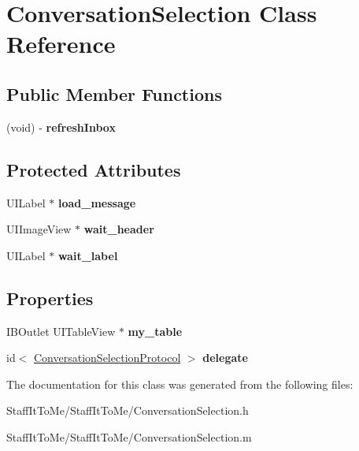 \hypertarget{interface_conversation_selection}{
\section{\-Conversation\-Selection \-Class \-Reference}
\label{interface_conversation_selection}
}
\subsection*{\-Public \-Member \-Functions}
\begin{DoxyCompactItemize}
\item 
\hypertarget{interface_conversation_selection_ae2607745a5be5d8b848266d91ce494c6}{
(void) -\/ {\bfseries refresh\-Inbox}}
\label{interface_conversation_selection_ae2607745a5be5d8b848266d91ce494c6}

\end{DoxyCompactItemize}
\subsection*{\-Protected \-Attributes}
\begin{DoxyCompactItemize}
\item 
\hypertarget{interface_conversation_selection_a22081259c41aa1f2caa4d0aeedb1d831}{
\-U\-I\-Label $\ast$ {\bfseries load\-\_\-message}}
\label{interface_conversation_selection_a22081259c41aa1f2caa4d0aeedb1d831}

\item 
\hypertarget{interface_conversation_selection_af17d805829e7c201b18134f7bcda094b}{
\-U\-I\-Image\-View $\ast$ {\bfseries wait\-\_\-header}}
\label{interface_conversation_selection_af17d805829e7c201b18134f7bcda094b}

\item 
\hypertarget{interface_conversation_selection_a473545406c4eef5494f1ae541436baa5}{
\-U\-I\-Label $\ast$ {\bfseries wait\-\_\-label}}
\label{interface_conversation_selection_a473545406c4eef5494f1ae541436baa5}

\end{DoxyCompactItemize}
\subsection*{\-Properties}
\begin{DoxyCompactItemize}
\item 
\hypertarget{interface_conversation_selection_a0bd0dedec38abcefbbf0b072b6b3121b}{
\-I\-B\-Outlet \-U\-I\-Table\-View $\ast$ {\bfseries my\-\_\-table}}
\label{interface_conversation_selection_a0bd0dedec38abcefbbf0b072b6b3121b}

\item 
\hypertarget{interface_conversation_selection_a345877c6bc76234d3f23c5dbe3ae4ea6}{
id$<$ \hyperlink{protocol_conversation_selection_protocol-p}{\-Conversation\-Selection\-Protocol} $>$ {\bfseries delegate}}
\label{interface_conversation_selection_a345877c6bc76234d3f23c5dbe3ae4ea6}

\end{DoxyCompactItemize}


\-The documentation for this class was generated from the following files\-:\begin{DoxyCompactItemize}
\item 
\-Staff\-It\-To\-Me/\-Staff\-It\-To\-Me/\-Conversation\-Selection.\-h\item 
\-Staff\-It\-To\-Me/\-Staff\-It\-To\-Me/\-Conversation\-Selection.\-m\end{DoxyCompactItemize}
